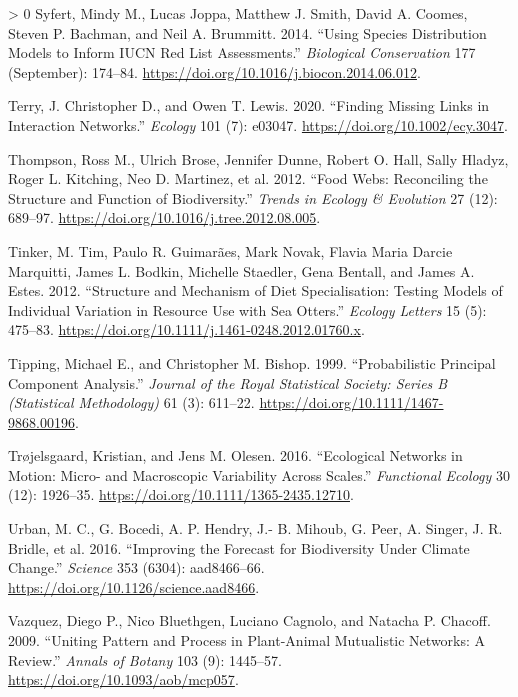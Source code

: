 \documentclass[10pt,oneside]{article}
\newlength{\cslhangindent}
\newenvironment{CSLReferences}[3] %
 {%
  \setlength{\parindent}{0pt}
  \ifodd #1 \everypar{\setlength{\hangindent}{\cslhangindent}}\ignorespaces\fi
  \ifnum #2 > 0
  \setlength{\parskip}{#2\baselineskip}
  \fi
 }%
 {}
\begin{document}
\begin{CSLReferences}{1}{0}
\leavevmode\hypertarget{ref-Syfert2014UsiSpe}{}%
Syfert, Mindy M., Lucas Joppa, Matthew J. Smith, David A. Coomes, Steven
P. Bachman, and Neil A. Brummitt. 2014. {``Using Species Distribution
Models to Inform IUCN Red List Assessments.''} \emph{Biological
Conservation} 177 (September): 174--84.
\url{https://doi.org/10.1016/j.biocon.2014.06.012}.

\leavevmode\hypertarget{ref-Terry2020FinMis}{}%
Terry, J. Christopher D., and Owen T. Lewis. 2020. {``Finding Missing
Links in Interaction Networks.''} \emph{Ecology} 101 (7): e03047.
\url{https://doi.org/10.1002/ecy.3047}.

\leavevmode\hypertarget{ref-Thompson2012FooWeb}{}%
Thompson, Ross M., Ulrich Brose, Jennifer Dunne, Robert O. Hall, Sally
Hladyz, Roger L. Kitching, Neo D. Martinez, et al. 2012. {``Food Webs:
Reconciling the Structure and Function of Biodiversity.''} \emph{Trends
in Ecology \& Evolution} 27 (12): 689--97.
\url{https://doi.org/10.1016/j.tree.2012.08.005}.

\leavevmode\hypertarget{ref-Tinker2012StrMec}{}%
Tinker, M. Tim, Paulo R. Guimarães, Mark Novak, Flavia Maria Darcie
Marquitti, James L. Bodkin, Michelle Staedler, Gena Bentall, and James
A. Estes. 2012. {``Structure and Mechanism of Diet Specialisation:
Testing Models of Individual Variation in Resource Use with Sea
Otters.''} \emph{Ecology Letters} 15 (5): 475--83.
\url{https://doi.org/10.1111/j.1461-0248.2012.01760.x}.

\leavevmode\hypertarget{ref-Tipping1999ProPri}{}%
Tipping, Michael E., and Christopher M. Bishop. 1999. {``Probabilistic
Principal Component Analysis.''} \emph{Journal of the Royal Statistical
Society: Series B (Statistical Methodology)} 61 (3): 611--22.
\url{https://doi.org/10.1111/1467-9868.00196}.

\leavevmode\hypertarget{ref-Trojelsgaard2016EcoNet}{}%
Trøjelsgaard, Kristian, and Jens M. Olesen. 2016. {``Ecological Networks
in Motion: Micro- and Macroscopic Variability Across Scales.''}
\emph{Functional Ecology} 30 (12): 1926--35.
\url{https://doi.org/10.1111/1365-2435.12710}.

\leavevmode\hypertarget{ref-Urban2016ImpFor}{}%
Urban, M. C., G. Bocedi, A. P. Hendry, J.- B. Mihoub, G. Peer, A.
Singer, J. R. Bridle, et al. 2016. {``Improving the Forecast for
Biodiversity Under Climate Change.''} \emph{Science} 353 (6304):
aad8466--66. \url{https://doi.org/10.1126/science.aad8466}.

\leavevmode\hypertarget{ref-Vazquez2009UniPat}{}%
Vazquez, Diego P., Nico Bluethgen, Luciano Cagnolo, and Natacha P.
Chacoff. 2009. {``Uniting Pattern and Process in Plant-Animal
Mutualistic Networks: A Review.''} \emph{Annals of Botany} 103 (9):
1445--57. \url{https://doi.org/10.1093/aob/mcp057}.


\end{CSLReferences}
\end{document}
